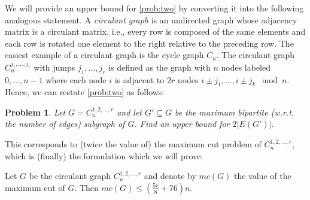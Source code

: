 \documentclass[nolineno,a4paper,USenglish,cleveref,autoref,thm-restate]
{socg}
\newtheorem{problem}{Problem}
\begin{document}
 We will provide an upper bound for \cref{prob:two} by converting it into the following analogous statement.
A \emph{circulant graph} is an undirected graph whose adjacency matrix is a circulant matrix, i.e., every row is composed of the same elements and each row is rotated one element to the right relative to the preceding row.
The easiest example of a circulant graph is the cycle graph $C_n$.
The circulant graph $C_n^{j_1,\dots,j_r}$ with jumps $j_1,\dots,j_r$ is defined as the graph with $n$ nodes labeled $0, \dots, n-1$ where each node $i$ is adjacent to $2r$ nodes $i\pm j_1,\dots,i \pm j_k \mod n$.
Hence, we can restate \cref{prob:two} as follows:
\begin{problem}
    Let $G = C_n^{1,2,\dots,r}$ and let $G' \subseteq G$  be the maximum bipartite (w.r.t. the number of edges) subgraph of $G$. Find an upper bound for $2|E(G')|$.
\end{problem}
This corresponds to (twice the value of) the maximum cut problem of $C_n^{1,2,\dots,r}$, which is (finally) the formulation which we will prove:
\begin{lemma} \label{lem:maxcut}
Let $G$ be the circulant graph $C_n^{1,2,\dots,r}$ and denote by $mc(G)$ the value of the maximum cut of $G$. Then $ mc(G) \leq (\frac{5r}{8}+76)n$. 
\end{lemma}
\end{document}
